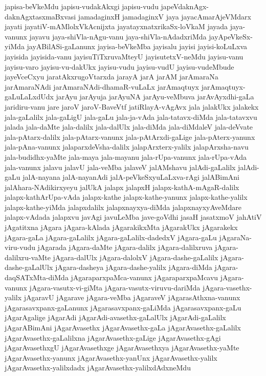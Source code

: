 {japisa-beVkeMdu
japisu-vudakAkxgi
japisu-vudu
japeVdaknAgx-daknAgxtasxmaBxvasi
jamadaginxH
jamadaginxV
jaya
jayacAmarAjeVMdarx
jayati
jayatiV-mAMlolxVkAcnijxta
jayatayxnatxrikaSx-loVkaM
jayada
jaya-vanunx
jayavu
jaya-shiVla-nAgu-vanu
jaya-shiVla-nAdadxriMda
jayApeVkeSx-yiMda
jayABilASi-gaLanunx
jayisa-beVkeMba
jayisalu
jayisi
jayisi-koLuLxva
jayisida
jayisida-vanu
jayisuTiTxruvaMteyU
jayisutetxV-neMdu
jayisu-vanu
jayisu-varo
jayisu-vu-dakUkx
jayisu-vudu
jayisu-vudU
jayisu-vudeMbude
jayeVceCxyu
jaratAkxrugoVtarxda
jarayA
jarA
jarAM
jarAmaraNa
jarAmaraNAdi
jarAmaraNAdi-dhamaR-vuLaLx
jarAmaqtuyx
jarAmaqtuyx-gaLuLaLxdUdx
jarAyu
jarAyuja
jarAyuNA
jarAyu-veMbuva
jarAvAyxdhi-gaLa
jaridiru-vanu
jare
jaroV
jaroV-BaveVtf
jatiRlayA-vAgAvx
jala
jalakUkx
jalakekx
jala-gaLalilx
jala-gaLigU
jala-gaLu
jala-ja-vAda
jala-tatavx-diMda
jala-tatavxvu
jalada
jala-daMte
jala-dalilx
jala-dalUlx
jala-diMda
jala-diMdaleV
jala-deVvate
jala-pAtarx-dalilx
jala-pAtarx-vanunx
jala-pAtArxdi-gaLige
jala-pAterx-yanunx
jala-pAna-vanunx
jalaparxdeVsha-dalilx
jalapArxterx-yalilx
jalapArxsha-navu
jala-budidhx-yaMte
jala-maya
jala-mayanu
jala-rUpa-vanunx
jala-rUpa-vAda
jala-vanunx
jalavu
jalavU
jala-veMba
jalaveV
jalAMshavu
jalAdi-gaLalilx
jalAdi-gaLu
jalA-nayana
jalA-nayanAdi
jalA-peVkeSxyuLaLxva-rAgi
jalABimAni
jalAhara-NAdikirxyeyu
jalUkA
jalapx
jalapxH
jalapx-kathA-mAgaR-dalilx
jalapx-kathArUpa-vAda
jalapx-kathe
jalapx-kathe-yanunx
jalapx-kathe-yalilx
jalapx-kathe-yiMda
jalapxdalilx
jalapxnayxya-diMda
jalapxnayxyAveMdare
jalapx-vAdada
jalapxvu
javAgi
javuLeMba
jave-goVdhi
jasaH
jasatxmoV
jahAtiV
jAgatitxna
jAgara
jAgara-kAlada
jAgarakikxMta
jAgarakUkx
jAgarakekx
jAgara-gaLa
jAgara-gaLalilx
jAgara-gaLalilx-dadedxV
jAgara-gaLu
jAgaraNa-viru-vudu
jAgarada
jAgara-daMte
jAgara-dalilx
jAgara-dalilxruva
jAgara-dalilxru-vaMte
jAgara-dalUlx
jAgara-dalolxV
jAgara-dashe-gaLalilx
jAgara-dashe-gaLalUlx
jAgara-dasheya
jAgara-dashe-yalilx
jAgara-diMda
jAgara-daqSATxMta-diMda
jAgaraparxpaMca-vanunx
jAgaraparxpaMcavu
jAgara-vanunx
jAgara-vasutx-vi-giMta
jAgara-vasutx-viruvu-dariMda
jAgara-vasethx-yalilx
jAgaravU
jAgarave
jAgara-veMba
jAgaraveV
jAgarasAthxna-vanunx
jAgarasavxpanx-gaLanunx
jAgarasavxpanx-gaLiMda
jAgarasavxpanx-gaLu
jAgarAgalige
jAgarAdi
jAgarAdi-avasethx-gaLalUlx
jAgarAdi-gaLalilx
jAgarABimAni
jAgarAvasethx
jAgarAvasethx-gaLa
jAgarAvasethx-gaLalilx
jAgarAvasethx-gaLalilxna
jAgarAvasethx-gaLige
jAgarAvasethx-gAgi
jAgarAvasethxgU
jAgarAvasethxge
jAgarAvasethxya
jAgarAvasethx-yaMte
jAgarAvasethx-yanunx
jAgarAvasethx-yanUnx
jAgarAvasethx-yalilx
jAgarAvasethx-yalilxdadx
jAgarAvasethx-yalilxdAdxneMdu
}
